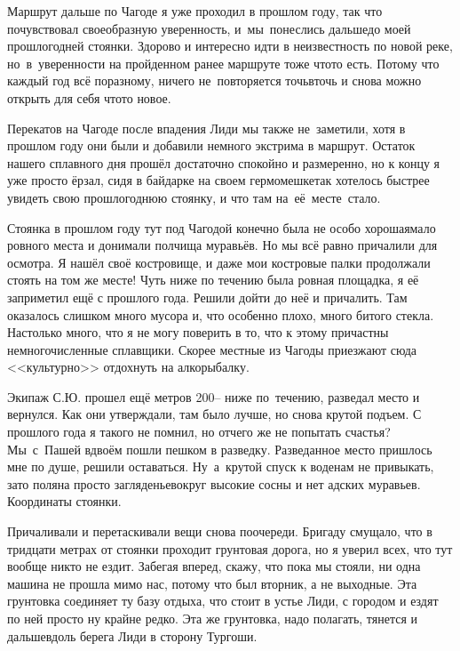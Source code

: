 Маршрут дальше по Чагоде я уже проходил в прошлом году, так что почувствовал своеобразную уверенность, и~мы~понеслись дальше\mdash  до моей прошлогодней стоянки. Здорово и интересно идти в неизвестность по новой реке, но~в~уверенности на пройденном ранее маршруте тоже что\sdash то есть. Потому что каждый год всё по\sdash разному, ничего не~повторяется точь\sdash в\sdash точь и снова можно открыть для себя что\sdash то новое. 
 
Перекатов на Чагоде после впадения Лиди мы также не~заметили, хотя в прошлом году они были и добавили немного экстрима в маршрут. Остаток нашего сплавного дня прошёл достаточно спокойно и размеренно, но к концу я уже просто ёрзал, сидя в байдарке на своем гермомешке\mdash  так хотелось быстрее увидеть свою прошлогоднюю стоянку, и что там на~её~месте~стало. 

Стоянка в прошлом году тут под Чагодой конечно была не особо хорошая\mdash  мало ровного места и донимали полчища муравьёв. Но мы всё равно причалили для осмотра. Я нашёл своё костровище, и даже мои костровые палки продолжали стоять на том же месте! Чуть ниже по течению была ровная площадка, я её заприметил ещё с прошлого года. Решили дойти до неё и причалить. Там оказалось слишком много мусора и, что особенно плохо, много битого стекла. Настолько много, что я не могу поверить в то, что к этому причастны немногочисленные сплавщики. Скорее местные из Чагоды приезжают сюда <<культурно>> отдохнуть на алкорыбалку. 

Экипаж С.Ю. прошел ещё метров 200\thinspace\nobreakdash-- ниже по~течению, разведал место и вернулся. Как они утверждали, там было лучше, но снова крутой подъем. С прошлого года я такого не помнил, но отчего же не попытать счастья? Мы~с~Пашей вдвоём пошли пешком в разведку. Разведанное место пришлось мне по душе, решили оставаться. Ну~а~крутой спуск к воде\mdash  нам не привыкать, зато поляна просто загляденье\mdash  вокруг высокие сосны и нет адских муравьев. Координаты стоянки\mdash \CoordsChagodaSixteenDrunk.

Причаливали и перетаскивали вещи снова по\sdash очереди. Бригаду смущало, что в тридцати метрах от стоянки проходит грунтовая дорога, но я уверил всех, что тут вообще никто не ездит. Забегая вперед, скажу, что пока мы стояли, ни одна машина не прошла мимо нас, потому что был вторник, а не выходные. Эта грунтовка соединяет ту базу отдыха, что стоит в устье Лиди, с городом и ездят по ней просто ну крайне редко. Эта же грунтовка, надо полагать, тянется и дальше\mdash вдоль берега Лиди в сторону Тургоши.

